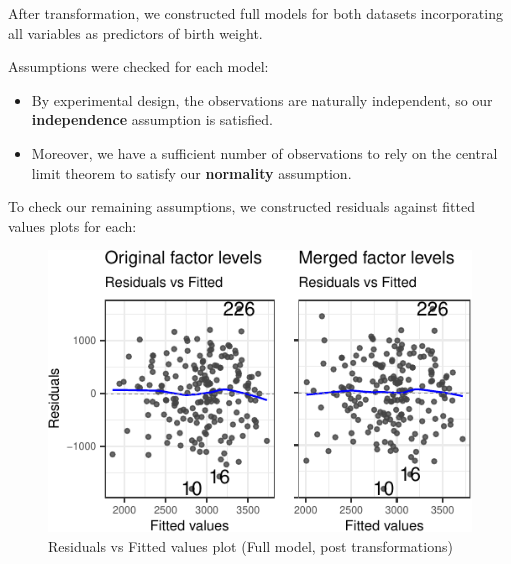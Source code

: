 \documentclass[letterpaper,9pt,twocolumn,twoside,]{pinp}
\providecommand{\tightlist}{%
  \setlength{\itemsep}{0pt}\setlength{\parskip}{0pt}}
\begin{document}
After transformation, we constructed full models for both datasets
incorporating all variables as predictors of birth weight.

\small

\begin{Shaded}
\begin{Highlighting}[]
\OtherTok{\textless{}{-}} \SpecialCharTok{\textasciitilde{}}
\OtherTok{\textless{}{-}} \SpecialCharTok{\textasciitilde{}}
\end{Highlighting}
\end{Shaded}

Assumptions were checked for each model:

\begin{itemize}
\tightlist
\item
  By experimental design, the observations are naturally independent, so
  our \textbf{independence} assumption is satisfied.
\item
  Moreover, we have a sufficient number of observations to rely on the
  central limit theorem to satisfy our \textbf{normality} assumption.
\end{itemize}

To check our remaining assumptions, we constructed residuals against
fitted values plots for each:

\begin{figure}

{\centering \includegraphics{Executive-Summary_files/figure-latex/residvfittedfull-1} 

}

\caption{Residuals vs Fitted values plot (Full model, post transformations)}\label{fig:residvfittedfull}
\end{figure}
\end{document}
